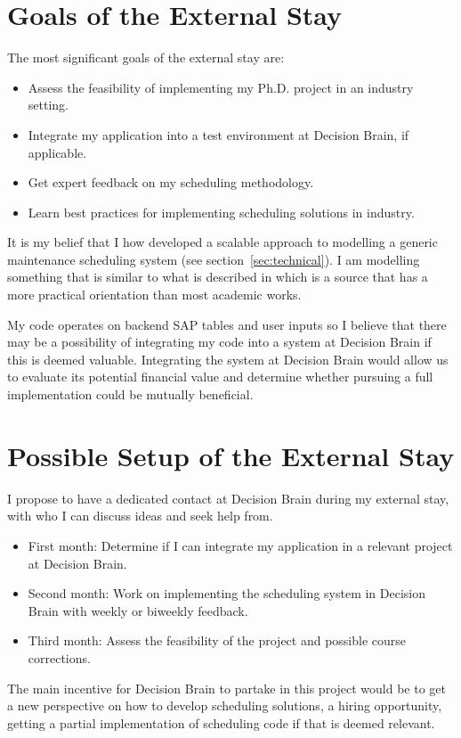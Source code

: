 \section{Goals of the External Stay}
The most significant goals of the external stay are:

\begin{itemize}
	\item Assess the feasibility of implementing my Ph.D. project in an industry setting.
	\item Integrate my application into a test environment at Decision Brain, if applicable.
	\item Get expert feedback on my scheduling methodology. 
	\item Learn best practices for implementing scheduling solutions in industry.
\end{itemize}

It is my belief that I how developed a scalable approach to modelling a generic 
maintenance scheduling system (see section~\ref{sec:technical}). I am 
modelling something that is similar to what is described in \citet{palmerMaintenancePlanningScheduling2019} 
which is a source that has a more practical orientation than most academic works. 

My code operates on backend SAP tables and user inputs so I believe that there may be a possibility of integrating my 
code into a system at Decision Brain if this is deemed valuable. Integrating the system at Decision 
Brain would allow us to evaluate its potential financial value and determine whether pursuing a
full implementation could be mutually beneficial.

\newpage
\section{Possible Setup of the External Stay}
I propose to have a dedicated contact at Decision Brain during my external stay, with who I can discuss ideas and seek help from.

\begin{itemize}
	\item First month: Determine if I can integrate my application in a relevant project at Decision Brain.
	\item Second month: Work on implementing the scheduling system in Decision Brain with weekly or biweekly feedback.
	\item Third month: Assess the feasibility of the project and possible course corrections.
\end{itemize}

The main incentive for Decision Brain to partake in this project would be to get a new perspective on how to develop scheduling solutions,
a hiring opportunity, getting a partial implementation of scheduling code if that is deemed relevant.

